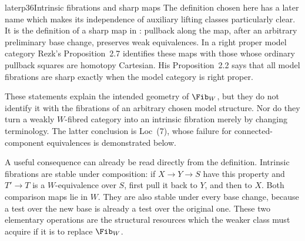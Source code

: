 \begin{dcomment}{later}{p36}{Intrinsic fibrations and sharp maps}
The definition chosen here has a later name which makes its independence of auxiliary lifting classes particularly clear. It is the definition of a sharp map in \citet[Section~2]{Rezk1998Sharp}: pullback along the map, after an arbitrary preliminary base change, preserves weak equivalences. In a right proper model category Rezk's Proposition~2.7 identifies these maps with those whose ordinary pullback squares are homotopy Cartesian. His Proposition~2.2 says that all model fibrations are sharp exactly when the model category is right proper.

These statements explain the intended geometry of $\Fib_W$, but they do not identify it with the fibrations of an arbitrary chosen model structure. Nor do they turn a weakly $W$-fibred category into an intrinsic fibration merely by changing terminology. The latter conclusion is Loc~(7), whose failure for connected-component equivalences is demonstrated below.

A useful consequence can already be read directly from the definition. Intrinsic fibrations are stable under composition: if $X\to Y\to S$ have this property and $T'\to T$ is a $W$-equivalence over $S$, first pull it back to $Y$, and then to $X$. Both comparison maps lie in $W$. They are also stable under every base change, because a test over the new base is already a test over the original one. These two elementary operations are the structural resources which the weaker class must acquire if it is to replace $\Fib_W$.
\end{dcomment}

